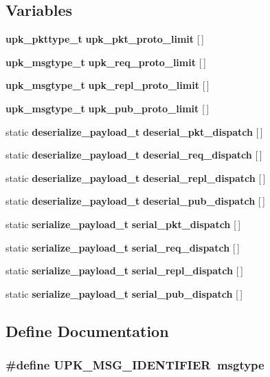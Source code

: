 \subsection*{Variables}
\begin{DoxyCompactItemize}
\item 
{\bf upk\_\-pkttype\_\-t} {\bf upk\_\-pkt\_\-proto\_\-limit} [$\,$]
\item 
{\bf upk\_\-msgtype\_\-t} {\bf upk\_\-req\_\-proto\_\-limit} [$\,$]
\item 
{\bf upk\_\-msgtype\_\-t} {\bf upk\_\-repl\_\-proto\_\-limit} [$\,$]
\item 
{\bf upk\_\-msgtype\_\-t} {\bf upk\_\-pub\_\-proto\_\-limit} [$\,$]
\item 
static {\bf deserialize\_\-payload\_\-t} {\bf deserial\_\-pkt\_\-dispatch} [$\,$]
\item 
static {\bf deserialize\_\-payload\_\-t} {\bf deserial\_\-req\_\-dispatch} [$\,$]
\item 
static {\bf deserialize\_\-payload\_\-t} {\bf deserial\_\-repl\_\-dispatch} [$\,$]
\item 
static {\bf deserialize\_\-payload\_\-t} {\bf deserial\_\-pub\_\-dispatch} [$\,$]
\item 
static {\bf serialize\_\-payload\_\-t} {\bf serial\_\-pkt\_\-dispatch} [$\,$]
\item 
static {\bf serialize\_\-payload\_\-t} {\bf serial\_\-req\_\-dispatch} [$\,$]
\item 
static {\bf serialize\_\-payload\_\-t} {\bf serial\_\-repl\_\-dispatch} [$\,$]
\item 
static {\bf serialize\_\-payload\_\-t} {\bf serial\_\-pub\_\-dispatch} [$\,$]
\end{DoxyCompactItemize}


\subsection{Define Documentation}
\subsubsection[{UPK\_\-MSG\_\-IDENTIFIER}]{\setlength{\rightskip}{0pt plus 5cm}\#define UPK\_\-MSG\_\-IDENTIFIER~msgtype}\label{upk__v0__protocol__serializer_8c_a085168993b6f7b7f00302e0c30df8302}
